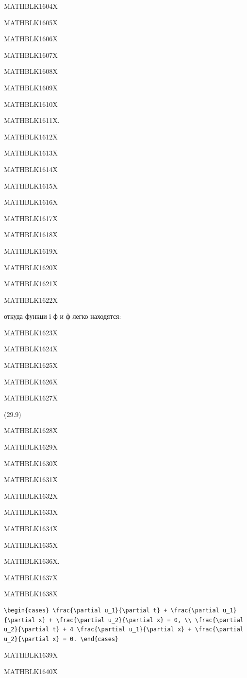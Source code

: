 \documentclass[
  ukrainian,
]{article}
\begin{document}
MATHBLK1604X

MATHBLK1605X

MATHBLK1606X

MATHBLK1607X

MATHBLK1608X

MATHBLK1609X

MATHBLK1610X

MATHBLK1611X.

MATHBLK1612X

MATHBLK1613X

MATHBLK1614X

MATHBLK1615X

MATHBLK1616X

MATHBLK1617X

MATHBLK1618X

MATHBLK1619X

MATHBLK1620X

MATHBLK1621X

MATHBLK1622X

откуда функци і ф и ф легко находятся:

MATHBLK1623X

MATHBLK1624X

MATHBLK1625X

MATHBLK1626X

MATHBLK1627X

(29.9)

MATHBLK1628X

MATHBLK1629X

MATHBLK1630X

MATHBLK1631X

MATHBLK1632X

MATHBLK1633X

MATHBLK1634X

MATHBLK1635X

MATHBLK1636X.

MATHBLK1637X

MATHBLK1638X

\begin{verbatim}
\begin{cases} \frac{\partial u_1}{\partial t} + \frac{\partial u_1}{\partial x} + \frac{\partial u_2}{\partial x} = 0, \\ \frac{\partial u_2}{\partial t} + 4 \frac{\partial u_1}{\partial x} + \frac{\partial u_2}{\partial x} = 0. \end{cases}
\end{verbatim}

MATHBLK1639X

MATHBLK1640X
\end{document}
